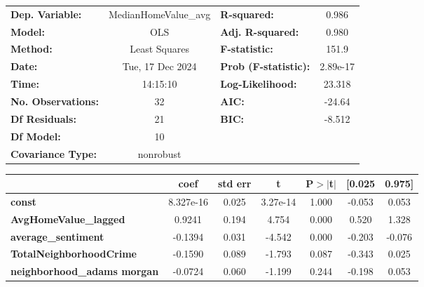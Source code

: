 \begin{center}
\begin{tabular}{lclc}
\toprule
\textbf{Dep. Variable:}                 & MedianHomeValue\_avg & \textbf{  R-squared:         } &     0.986   \\
\textbf{Model:}                         &         OLS          & \textbf{  Adj. R-squared:    } &     0.980   \\
\textbf{Method:}                        &    Least Squares     & \textbf{  F-statistic:       } &     151.9   \\
\textbf{Date:}                          &   Tue, 17 Dec 2024   & \textbf{  Prob (F-statistic):} &  2.89e-17   \\
\textbf{Time:}                          &       14:15:10       & \textbf{  Log-Likelihood:    } &    23.318   \\
\textbf{No. Observations:}              &            32        & \textbf{  AIC:               } &    -24.64   \\
\textbf{Df Residuals:}                  &            21        & \textbf{  BIC:               } &    -8.512   \\
\textbf{Df Model:}                      &            10        & \textbf{                     } &             \\
\textbf{Covariance Type:}               &      nonrobust       & \textbf{                     } &             \\
\bottomrule
\end{tabular}
\begin{tabular}{lcccccc}
                                        & \textbf{coef} & \textbf{std err} & \textbf{t} & \textbf{P$> |$t$|$} & \textbf{[0.025} & \textbf{0.975]}  \\
\midrule
\textbf{const}                          &    8.327e-16  &        0.025     &  3.27e-14  &         1.000        &       -0.053    &        0.053     \\
\textbf{AvgHomeValue\_lagged}           &       0.9241  &        0.194     &     4.754  &         0.000        &        0.520    &        1.328     \\
\textbf{average\_sentiment}             &      -0.1394  &        0.031     &    -4.542  &         0.000        &       -0.203    &       -0.076     \\
\textbf{TotalNeighborhoodCrime}         &      -0.1590  &        0.089     &    -1.793  &         0.087        &       -0.343    &        0.025     \\
\textbf{neighborhood\_adams morgan}     &      -0.0724  &        0.060     &    -1.199  &         0.244        &       -0.198    &        0.053     \\

\end{tabular}
\end{center}
